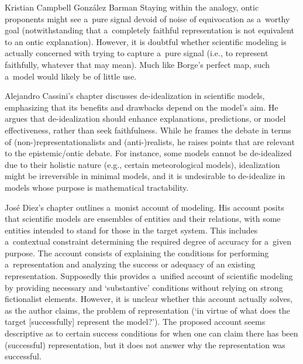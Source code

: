 \begin{recengenv}{Kristian Campbell González Barman}
Staying within the analogy, ontic proponents might see a~pure signal devoid of noise of equivocation as a~worthy goal (notwithstanding that a~completely faithful representation is not equivalent to an ontic explanation). However, it is doubtful whether scientific modeling is actually concerned with trying to capture a~pure signal (i.e., to represent faithfully, whatever that may mean). Much like Borge's perfect map, such a~model would likely be of little use.

Alejandro Cassini's chapter discusses de-idealization in scientific models, emphasizing that its benefits and drawbacks depend on the model's aim. He argues that de-idealization should enhance explanations, predictions, or model effectiveness, rather than seek faithfulness. While he frames the debate in terms of (non-)representationalists and (anti-)realists, he raises points that are relevant to the epistemic/ontic debate. For instance, some models cannot be de-idealized due to their holistic nature (e.g., certain meteorological models), idealization might be irreversible in minimal models, and it is undesirable to de-idealize in models whose purpose is mathematical tractability.

José Diez's chapter outlines a~monist account of modeling. His account posits that scientific models are ensembles of entities and their relations, with some entities intended to stand for those in the target system. This includes a~contextual constraint determining the required degree of accuracy for a~given purpose. The account consists of explaining the conditions for performing a~representation and analyzing the success or adequacy of an existing representation. Supposedly this provides a~unified account of scientific modeling by providing necessary and ‘substantive' conditions without relying on strong fictionalist elements. However, it is unclear whether this account actually solves, as the author claims, the problem of representation (‘in virtue of what does the target [successfully] represent the model?'). The proposed account seems descriptive as to certain success conditions for when one can claim there has been (successful) representation, but it does not answer why the representation was successful.


\end{recengenv}
